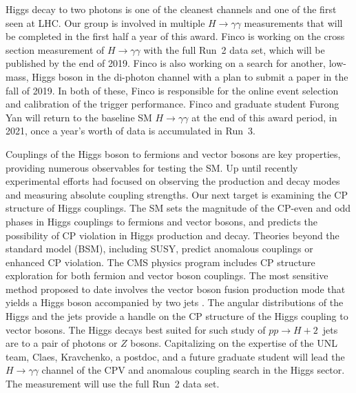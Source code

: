 Higgs decay to two photons is one of the cleanest channels and one of the first seen at LHC. Our group is involved in multiple $H\to\gamma\gamma$ measurements that will be completed in the first half a year of this award. Finco is working on the cross section measurement of  $H\to\gamma\gamma$ with the full Run~2 data set, which will be published by the end of 2019. Finco is also working on a search for another, low-mass, Higgs boson in the di-photon channel with a plan to submit a paper in the fall of 2019. In both of these, Finco is responsible for the online event selection and calibration of the trigger performance. Finco and graduate student Furong Yan will return to the baseline SM $H\to\gamma\gamma$ at the end of this award period, in 2021, once a year's worth of data is accumulated in Run~3.

Couplings of the Higgs boson to fermions and vector bosons are key properties, providing numerous observables for testing the SM.  Up until recently experimental efforts had focused on observing the production and decay modes and measuring absolute coupling strengths. Our next target is examining the CP structure of Higgs couplings. The SM sets the magnitude of the CP-even and odd phases in Higgs couplings to fermions and vector bosons, and predicts the possibility of CP violation in Higgs production and decay. Theories beyond the standard model (BSM), including SUSY, predict anomalous couplings or enhanced CP violation. The CMS physics program includes CP structure exploration for both fermion and vector boson couplings. The most sensitive method proposed to date involves the vector boson fusion production mode that yields a Higgs boson accompanied by two jets \cite{bib:H2jets}. The angular distributions of the Higgs and the jets provide a handle on the CP structure of the Higgs coupling to vector bosons. The Higgs decays best suited for such study of $pp\to H\!+\!2$~jets are to a pair of photons or $Z$ bosons. Capitalizing on the expertise of the UNL team, Claes, Kravchenko, a postdoc, and a future graduate student will lead the $H\to\gamma\gamma$ channel of the CPV and anomalous coupling search in the Higgs sector. The measurement will use the full Run~2 data set.

